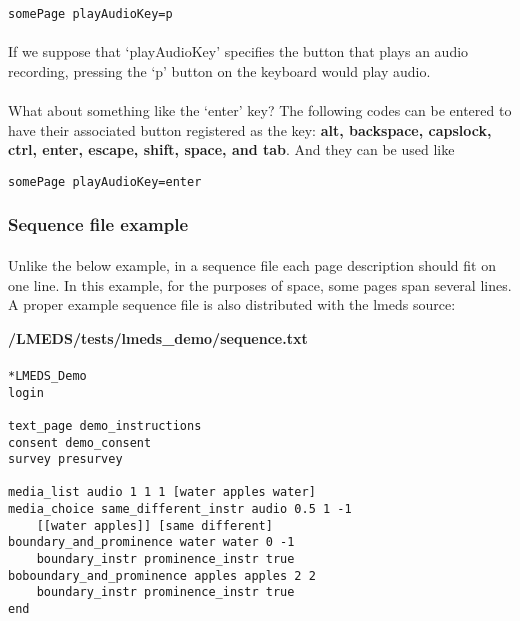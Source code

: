 \begin{lstlisting}
somePage playAudioKey=p
\end{lstlisting}

\paragraph{}
If we suppose that `playAudioKey' specifies the button that plays an audio recording, pressing the `p' button on the keyboard would play audio.

\paragraph{}
What about something like the `enter' key?  The following codes can be entered to have their associated button registered as the key:  \textbf{alt, backspace, capslock, ctrl, enter, escape, shift, space, and tab}.  And they can be used like

\begin{lstlisting}
somePage playAudioKey=enter
\end{lstlisting}


\subsubsection{Sequence file example}
\label{sec:sequenceFileExample}

\paragraph{}
Unlike the below example, in a sequence file each page description should fit on one line.  In this example, for the purposes of space, some pages span several lines.  A proper example sequence file is also distributed with the lmeds source:

\textbf{/LMEDS/tests/lmeds\_demo/sequence.txt}

\paragraph{}

\begin{tcolorbox}[colback=white,colframe=blue,width=\dimexpr\textwidth+12mm\relax,enlarge left by=-6mm,enlarge right by=6mm]

\begin{lstlisting}
*LMEDS_Demo
login

text_page demo_instructions
consent demo_consent
survey presurvey

media_list audio 1 1 1 [water apples water]
media_choice same_different_instr audio 0.5 1 -1
	[[water apples]] [same different]
boundary_and_prominence water water 0 -1
	boundary_instr prominence_instr true
boboundary_and_prominence apples apples 2 2 
	boundary_instr prominence_instr true
end
\end{lstlisting}
\end{tcolorbox}


